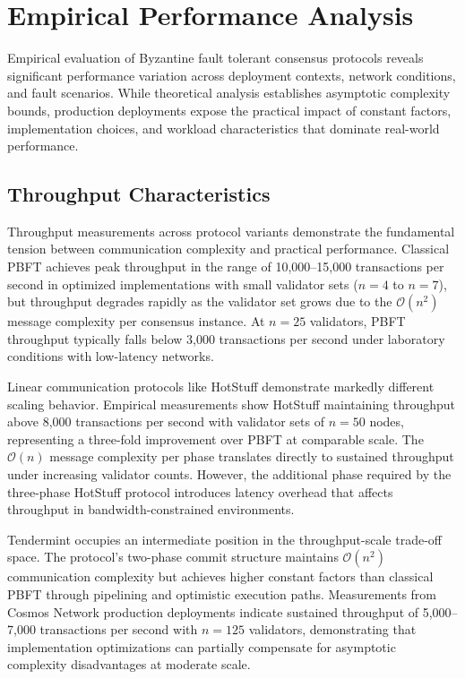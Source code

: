 \section{Empirical Performance Analysis}

Empirical evaluation of Byzantine fault tolerant consensus protocols reveals significant performance variation across deployment contexts, network conditions, and fault scenarios. While theoretical analysis establishes asymptotic complexity bounds, production deployments expose the practical impact of constant factors, implementation choices, and workload characteristics that dominate real-world performance.

\subsection{Throughput Characteristics}

Throughput measurements across protocol variants demonstrate the fundamental tension between communication complexity and practical performance. Classical PBFT achieves peak throughput in the range of 10,000--15,000 transactions per second in optimized implementations with small validator sets ($n = 4$ to $n = 7$), but throughput degrades rapidly as the validator set grows due to the $\mathcal{O}(n^2)$ message complexity per consensus instance. At $n = 25$ validators, PBFT throughput typically falls below 3,000 transactions per second under laboratory conditions with low-latency networks.

Linear communication protocols like HotStuff demonstrate markedly different scaling behavior. Empirical measurements show HotStuff maintaining throughput above 8,000 transactions per second with validator sets of $n = 50$ nodes, representing a three-fold improvement over PBFT at comparable scale. The $\mathcal{O}(n)$ message complexity per phase translates directly to sustained throughput under increasing validator counts. However, the additional phase required by the three-phase HotStuff protocol introduces latency overhead that affects throughput in bandwidth-constrained environments.

Tendermint occupies an intermediate position in the throughput-scale trade-off space. The protocol's two-phase commit structure maintains $\mathcal{O}(n^2)$ communication complexity but achieves higher constant factors than classical PBFT through pipelining and optimistic execution paths. Measurements from Cosmos Network production deployments indicate sustained throughput of 5,000--7,000 transactions per second with $n = 125$ validators, demonstrating that implementation optimizations can partially compensate for asymptotic complexity disadvantages at moderate scale.

